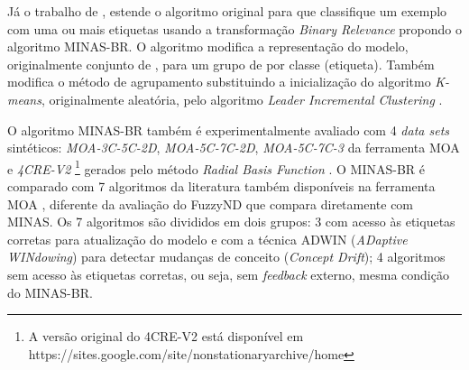 
Já o trabalho de , estende o algoritmo original para que
classifique um exemplo com uma ou mais etiquetas usando a transformação
\emph{Binary Relevance} propondo o algoritmo MINAS-BR.
O algoritmo modifica a representação do modelo, originalmente conjunto de \clusters, para
um grupo de \clusters por classe (etiqueta).
Também modifica o método de agrupamento substituindo a inicialização do 
algoritmo \emph{K-means}, originalmente aleatória, pelo algoritmo 
\emph{Leader Incremental Clustering} \cite{Vijaya2004505}.


O algoritmo MINAS-BR também é experimentalmente avaliado com 4 \emph{data sets}
sintéticos: \emph{MOA-3C-5C-2D}, \emph{MOA-5C-7C-2D}, \emph{MOA-5C-7C-3} da
ferramenta MOA \cite{MOA} e \emph{4CRE-V2}
\footnote{
    A versão original do \dataset 4CRE-V2 está disponível em 
    https://sites.google.com/site/nonstationaryarchive/home
}
gerados pelo método \emph{Radial Basis Function} \cite{souza2015}.
O MINAS-BR é comparado com 7 algoritmos da literatura também disponíveis na ferramenta
MOA \cite{MOA},
diferente da avaliação do FuzzyND que compara diretamente com MINAS.
Os 7 algoritmos são divididos em dois grupos: 3 com acesso às etiquetas corretas para
atualização do modelo e com a técnica ADWIN (\emph{ADaptive WINdowing}) para detectar
mudanças de conceito (\emph{Concept Drift}); 4 algoritmos sem acesso às etiquetas corretas,
ou seja, sem \emph{feedback} externo, mesma condição do MINAS-BR.


